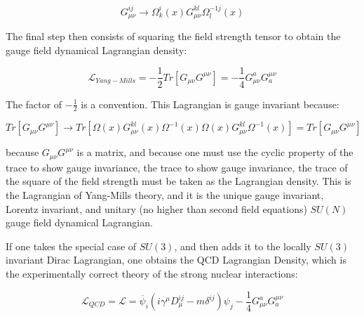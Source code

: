 \documentclass[a4]{article}
\begin{document}
    \begin{equation}
        G_{\mu \nu}^{ij} \rightarrow \Omega^{i}_{k} (x) G_{\mu \nu}^{k l} \Omega^{-1 j}_l (x)
    \end{equation}

    The final step then consists of squaring the field strength tensor to obtain the gauge field dynamical Lagrangian density:

    \begin{equation}
        \mathcal{L}_{Yang-Mills} = - \frac{1}{2} Tr[G_{\mu \nu} G^{\mu \nu}] = - \frac{1}{4} G_{\mu \nu}^{a} G^{\mu \nu}_{a}
    \end{equation}

    The factor of $- \frac{1}{2}$ is a convention. This Lagrangian is gauge invariant because:

    \begin{equation}
        Tr [G_{\mu \nu} G^{\mu \nu}] \rightarrow Tr [\Omega (x) G_{\mu \nu}^{k l} (x) \Omega^{-1} (x) \Omega (x) G_{\mu \nu}^{k l} \Omega^{-1} (x)] = Tr [G_{\mu \nu} G^{\mu \nu}]
    \end{equation}

    because $G_{\mu \nu} G^{\mu \nu}$ is a matrix, and because one must use the cyclic property of the trace to show gauge invariance,
    the trace to show gauge invariance, the trace of the square of the field strength must be taken as the Lagrangian density. This is
    the Lagrangian of Yang-Mills theory, and it is the unique gauge invariant, Lorentz invariant, and unitary (no higher than second
    field equations) $SU(N)$ gauge field dynamical Lagrangian.

    If one takes the special case of $SU(3)$, and then adds it to the locally $SU(3)$ invariant Dirac Lagrangian, one obtains the QCD 
    Lagrangian Density, which is the experimentally correct theory of the strong nuclear interactions:

    \begin{equation}
        \mathcal{L}_{QCD} = \mathcal{L} = \overline{\psi}_{i} (i \gamma^{\mu} D_{\mu}^{ij} - m \delta^{ij}) \psi_{j} - \frac{1}{4} G_{\mu \nu}^{a} G^{\mu \nu}_{a}
    \end{equation}
    
\end{document}
